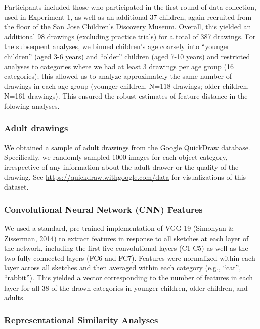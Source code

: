 \documentclass[10pt, letterpaper]{article}
\begin{document}
Participants included those who participated in the first round of data
collection, used in Experiment 1, as well as an additional 37 children,
again recruited from the floor of the San Jose Children's Discovery
Museum. Overall, this yielded an additional 98 drawings (excluding
practice trials) for a total of 387 drawings. For the subsequent
analyses, we binned children's age coarsely into ``younger children''
(aged 3-6 years) and ``older'' children (aged 7-10 years) and restricted
analyses to categories where we had at least 3 drawings per age group
(16 categories); this allowed us to analyze approximately the same
number of drawings in each age group (younger children, N=118 drawings;
older children, N=161 drawings). This ensured the robust estimates of
feature distance in the folowing analyses.

\subsubsection{Adult drawings}\label{adult-drawings}

We obtained a sample of adult drawings from the Google QuickDraw
database. Specifically, we randomly sampled 1000 images for each object
category, irrespective of any information about the adult drawer or the
quality of the drawing. See \url{https://quickdraw.withgoogle.com/data}
for visualizations of this dataset.

\subsubsection{Convolutional Neural Network (CNN)
Features}\label{convolutional-neural-network-cnn-features}

We used a standard, pre-trained implementation of VGG-19 (Simonyan \&
Zisserman, 2014) to extract features in response to all sketches at each
layer of the network, including the first five convolutional layers
(C1-C5) as well as the two fully-connected layers (FC6 and FC7).
Features were normalized within each layer across all sketches and then
averaged within each category (e.g., ``cat'', ``rabbit''). This yielded
a vector corresponding to the number of features in each layer for all
38 of the drawn categories in younger children, older children, and
adults.

\subsubsection{Representational Similarity
Analyses}\label{representational-similarity-analyses}
\end{document}
